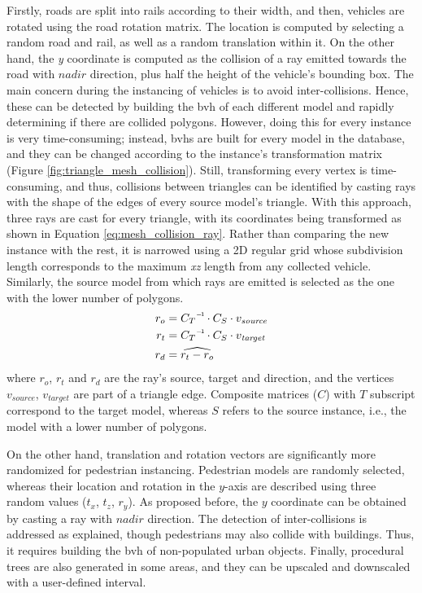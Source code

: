 Firstly, roads are split into rails according to their width, and then, vehicles are rotated using the road rotation matrix. The location is computed by selecting a random road and rail, as well as a random translation within it. On the other hand, the \textit{y} coordinate is computed as the collision of a ray emitted towards the road with $\textit{nadir}$ direction, plus half the height of the vehicle's bounding box. The main concern during the instancing of vehicles is to avoid inter-collisions. Hence, these can be detected by building the \acrshort{bvh} of each different model and rapidly determining if there are collided polygons. However, doing this for every instance is very time-consuming; instead, \acrshort{bvh}s are built for every model in the database, and they can be changed according to the instance's transformation matrix (Figure \ref{fig:triangle_mesh_collision}). Still, transforming every vertex is time-consuming, and thus, collisions between triangles can be identified by casting rays with the shape of the edges of every source model's triangle. With this approach, three rays are cast for every triangle, with its coordinates being transformed as shown in Equation \ref{eq:mesh_collision_ray}. Rather than comparing the new instance with the rest, it is narrowed using a 2D regular grid whose subdivision length corresponds to the maximum \textit{xz} length from any collected vehicle. Similarly, the source model from which rays are emitted is selected as the one with the lower number of polygons.
\begin{gather}
    \label{eq:mesh_collision_ray}
    \begin{aligned}
        r_{o} &= \inv{C_{T}} \cdot C_{S} \cdot v_{\textit{source}}\\
        r_{t} &= \inv{C_{T}} \cdot C_{S} \cdot v_{\textit{target}}\\
        r_{d} &= \widehat{r_{t} - r_{o}}
    \end{aligned}
\end{gather}
where $r_{o}$, $r_{t}$ and $r_{d}$ are the ray's source, target and direction, and the vertices $v_{\textit{source}}$, $v_{\textit{target}}$ are part of a triangle edge. Composite matrices ($C$) with $T$ subscript correspond to the target model, whereas $S$ refers to the source instance, i.e., the model with a lower number of polygons.

On the other hand, translation and rotation vectors are significantly more randomized for pedestrian instancing. Pedestrian models are randomly selected, whereas their location and rotation in the $y$-axis are described using three random values ($t_x$, $t_z$, $r_y$). As proposed before, the $y$ coordinate can be obtained by casting a ray with $\textit{nadir}$ direction. The detection of inter-collisions is addressed as explained, though pedestrians may also collide with buildings. Thus, it requires building the \acrshort{bvh} of non-populated urban objects. Finally, procedural trees are also generated in some areas, and they can be upscaled and downscaled with a user-defined interval.

